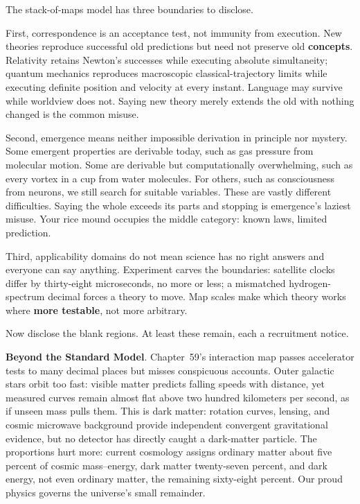 
The stack-of-maps model has three boundaries to disclose.

First, correspondence is an acceptance test, not immunity from execution. New theories reproduce successful old predictions but need not preserve old \textbf{concepts}. Relativity retains Newton's successes while executing absolute simultaneity; quantum mechanics reproduces macroscopic classical-trajectory limits while executing definite position and velocity at every instant. Language may survive while worldview does not. Saying new theory merely extends the old with nothing changed is the common misuse.

Second, emergence means neither impossible derivation in principle nor mystery. Some emergent properties are derivable today, such as gas pressure from molecular motion. Some are derivable but computationally overwhelming, such as every vortex in a cup from water molecules. For others, such as consciousness from neurons, we still search for suitable variables. These are vastly different difficulties. Saying the whole exceeds its parts and stopping is emergence's laziest misuse. Your rice mound occupies the middle category: known laws, limited prediction.

Third, applicability domains do not mean science has no right answers and everyone can say anything. Experiment carves the boundaries: satellite clocks differ by thirty-eight microseconds, no more or less; a mismatched hydrogen-spectrum decimal forces a theory to move. Map scales make which theory works where \textbf{more testable}, not more arbitrary.

Now disclose the blank regions. At least these remain, each a recruitment notice.

\textbf{Beyond the Standard Model}. Chapter~59's interaction map passes accelerator tests to many decimal places but misses conspicuous accounts. Outer galactic stars orbit too fast: visible matter predicts falling speeds with distance, yet measured curves remain almost flat above two hundred kilometers per second, as if unseen mass pulls them. This is dark matter: rotation curves, lensing, and cosmic microwave background provide independent convergent gravitational evidence, but no detector has directly caught a dark-matter particle. The proportions hurt more: current cosmology assigns ordinary matter about five percent of cosmic mass--energy, dark matter twenty-seven percent, and dark energy, not even ordinary matter, the remaining sixty-eight percent. Our proud physics governs the universe's small remainder.

